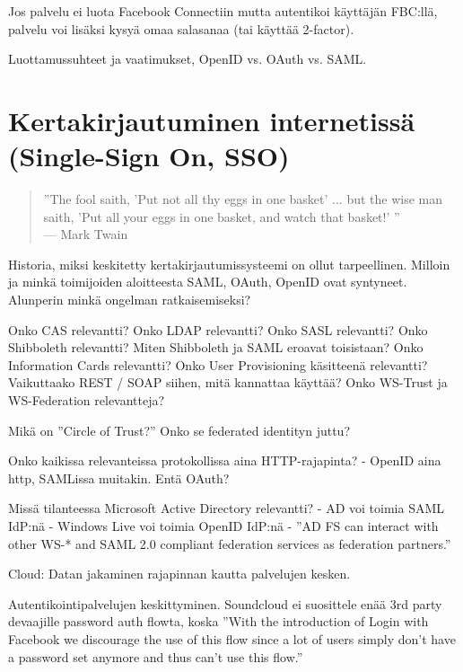 \documentclass[finnish,gradu]{tktltiki}
\begin{document}
  Jos palvelu ei luota Facebook Connectiin mutta autentikoi käyttäjän FBC:llä, palvelu voi lisäksi kysyä omaa salasanaa (tai käyttää 2-factor).

  Luottamussuhteet ja vaatimukset, OpenID vs. OAuth vs. SAML.



\section{Kertakirjautuminen internetissä (Single-Sign On, SSO)} %
\label{sec:Kertakirjautumisstandardit}
  \begin{quote}
      ''The fool saith, 'Put not all thy eggs in one basket' ...
      but the wise man saith, 'Put all your eggs in one basket, and watch that basket!' ''
      \\--- Mark Twain \cite{twain_eggs_1894}
  \end{quote}

  Historia, miksi keskitetty kertakirjautumissysteemi on ollut tarpeellinen.
  Milloin ja minkä toimijoiden aloitteesta SAML, OAuth, OpenID ovat syntyneet. Alunperin minkä ongelman ratkaisemiseksi?

  Onko CAS relevantti?
  Onko LDAP relevantti?
  Onko SASL relevantti?
  Onko Shibboleth relevantti? %
  Miten Shibboleth ja SAML eroavat toisistaan? %
  Onko Information Cards relevantti?
  Onko User Provisioning käsitteenä relevantti?
  Vaikuttaako REST / SOAP siihen, mitä kannattaa käyttää?
  Onko WS-Trust ja WS-Federation relevantteja?

  Mikä on ''Circle of Trust?'' Onko se federated identityn juttu?

  Onko kaikissa relevanteissa protokollissa aina HTTP-rajapinta?
  - OpenID aina http, SAMLissa muitakin. Entä OAuth?

  Missä tilanteessa Microsoft Active Directory relevantti?
  - AD voi toimia SAML IdP:nä
  - Windows Live voi toimia OpenID IdP:nä
  - ''AD FS can interact with other WS-* and SAML 2.0 compliant federation services as federation partners.''

  Cloud: Datan jakaminen rajapinnan kautta palvelujen kesken.

  Autentikointipalvelujen keskittyminen. Soundcloud ei suosittele enää 3rd party devaajille password auth flowta, koska ''With the introduction of Login with Facebook we discourage the use of this flow since a lot of users simply don't have a password set anymore and thus can't use this flow.''
\end{document}
